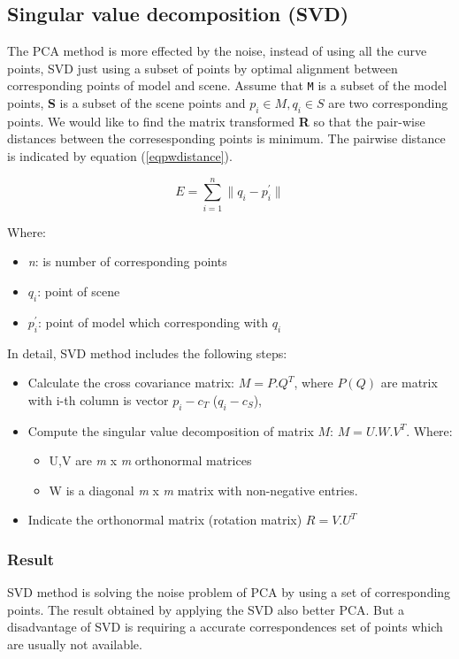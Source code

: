 \subsection{Singular value decomposition (SVD)}
The PCA method is more effected by the noise, instead of using all the curve points, SVD just using a subset of points by optimal alignment between corresponding points of model and scene. Assume that \texttt{M} is a subset of the model points, \textbf{S} is a subset of the scene points and $p_i \in M, q_i \in S$ are two corresponding points. We would like to find the matrix transformed \textbf{R} so that the pair-wise distances between the corresesponding points is minimum. The pairwise distance is indicated by equation (\ref{eqpwdistance}).
\begin{center}
\begin{equation}\label{eqpwdistance}
	E = \sum_{i=1}^{n} {\|q_i - p_i^{'}\|}
\end{equation}
\end{center}
Where:
\begin{itemize}
	\item \textit{n}: is number of corresponding points
	\item \textit{$q_i$}: point of scene
	\item \textit{$p_i^{'}$}: point of model which corresponding with \texttt{$q_i$}
\end{itemize}
In detail, SVD method includes the following steps:
\begin{itemize}
	\item Calculate the cross covariance matrix: $M = P.Q^T$, where $P(Q)$ are matrix with i-th column is vector $p_i - c_T$ ($q_i - c_S$),
	\item Compute the singular value decomposition of matrix $M$: \textbf{$M = U.W.V^T$}. Where:
	\begin{itemize}
		\item U,V are \textit{m} x \textit{m} orthonormal matrices
		\item W is a diagonal \textit{m} x \textit{m} matrix with non-negative entries.
	\end{itemize}
	\item Indicate the orthonormal matrix (rotation matrix) $R = V.U^T$
\end{itemize}
\subsubsection{Result}
SVD method is solving the noise problem of PCA by using a set of corresponding points. The result obtained by applying the SVD also better PCA. But a disadvantage of SVD is requiring a accurate correspondences set of points which are usually not available.
